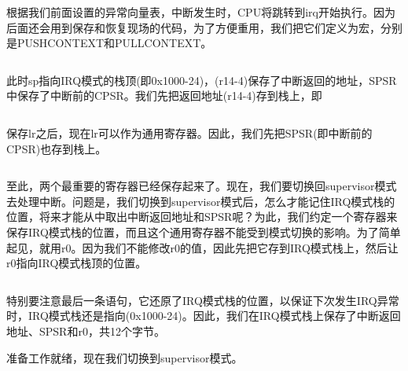 \documentclass[main.tex]{subfiles}
\begin{document}
\begin{CJK*}{UTF8}{song}
\begin{code}
\label{code:3-5}
\inputminted[firstline=25,lastline=45,linenos,numbersep=5pt,frame=lines,framesep=2mm]{c}{src/chapter03/kernel/machdep.h}
\end{code}

根据我们前面设置的异常向量表，中断发生时，CPU将跳转到irq开始执行。因为后面还会用到保存和恢复现场的代码，为了方便重用，我们把它们定义为宏，分别是PUSHCONTEXT和PULLCONTEXT。

\begin{code}
\label{code:3-6}
\inputminted[firstline=147,lastline=153,linenos,numbersep=5pt,frame=lines,framesep=2mm]{gas}{src/chapter03/kernel/entry.S}
\end{code}

此时sp指向IRQ模式的栈顶(即0x1000-24)，(r14-4)保存了中断返回的地址，SPSR中保存了中断前的CPSR。我们先把返回地址(r14-4)存到栈上，即

\begin{code}
\label{code:3-7}
\inputminted[firstline=40,lastline=43,linenos,numbersep=5pt,frame=lines,framesep=2mm]{gas}{src/chapter03/kernel/entry.S}
\end{code}

保存lr之后，现在lr可以作为通用寄存器。因此，我们先把SPSR(即中断前的CPSR)也存到栈上。
\begin{code}
\label{code:3-8}
\inputminted[firstline=44,lastline=45,linenos,numbersep=5pt,frame=lines,framesep=2mm]{gas}{src/chapter03/kernel/entry.S}
\end{code}

至此，两个最重要的寄存器已经保存起来了。现在，我们要切换回supervisor模式去处理中断。问题是，我们切换到supervisor模式后，怎么才能记住IRQ模式栈的位置，将来才能从中取出中断返回地址和SPSR呢？为此，我们约定一个寄存器来保存IRQ模式栈的位置，而且这个通用寄存器不能受到模式切换的影响。为了简单起见，就用r0。因为我们不能修改r0的值，因此先把它存到IRQ模式栈上，然后让r0指向IRQ模式栈顶的位置。

\begin{code}
\label{code:3-9}
\inputminted[firstline=46,lastline=48,linenos,numbersep=5pt,frame=lines,framesep=2mm]{gas}{src/chapter03/kernel/entry.S}
\end{code}

特别要注意最后一条语句，它还原了IRQ模式栈的位置，以保证下次发生IRQ异常时，IRQ模式栈还是指向(0x1000-24)。因此，我们在IRQ模式栈上保存了中断返回地址、SPSR和r0，共12个字节。
\par
准备工作就绪，现在我们切换到supervisor模式。


\end{CJK*}
\end{document}

